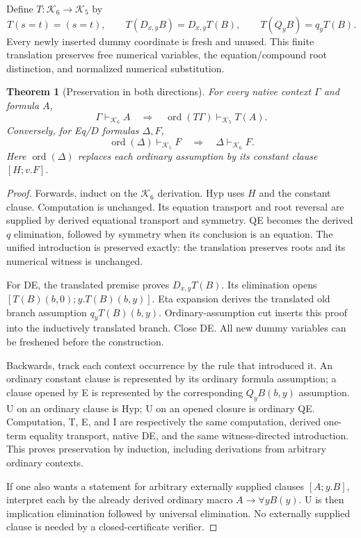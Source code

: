 \documentclass[11pt,letterpaper]{article}
\newtheorem{theorem}{Theorem}[section]
\theoremstyle{definition}\newtheorem{definition}[theorem]{Definition}
\begin{document}
Define $T:\mathcal K_6\to\mathcal K_5$ by
\[
 T(s=t)=(s=t),\qquad
 T(D_{x,y}B)=D_{x,y}T(B),\qquad
 T(Q_yB)=q_yT(B).
\]
Every newly inserted dummy coordinate is fresh and unused. This finite
translation preserves free numerical variables, the equation/compound
root distinction, and normalized numerical substitution.

\begin{theorem}[Preservation in both directions]
For every native context $\Gamma$ and formula $A$,
\[
 \Gamma\vdash_{\mathcal K_6} A
 \quad\Longrightarrow\quad
 \operatorname{ord}(T\Gamma)\vdash_{\mathcal K_5}T(A).
\]
Conversely, for Eq/$D$ formulas $\Delta,F$,
\[
 \operatorname{ord}(\Delta)\vdash_{\mathcal K_5}F
 \quad\Longrightarrow\quad
 \Delta\vdash_{\mathcal K_6}F.
\]
Here $\operatorname{ord}(\Delta)$ replaces each ordinary assumption by its
constant clause $[H;v.F]$.
\end{theorem}
\begin{proof}
Forwards, induct on the $\mathcal K_6$ derivation. Hyp uses $H$ and the
constant clause. Computation is unchanged. Its equation transport and
root reversal are supplied by derived equational transport and symmetry.
QE becomes the derived $q$ elimination, followed by symmetry when its
conclusion is an equation. The unified introduction is preserved exactly:
the translation preserves roots and its numerical witness is unchanged.

For DE, the translated premise proves $D_{x,y}T(B)$. Its elimination
opens $[T(B)(b,0);y.T(B)(b,y)]$. Eta expansion derives the translated old
branch assumption $q_yT(B)(b,y)$. Ordinary-assumption cut inserts this
proof into the inductively translated branch. Close DE. All new dummy
variables can be freshened before the construction.

Backwards, track each context occurrence by the rule that introduced it.
An ordinary constant clause is represented by its ordinary formula
assumption; a clause opened by E is represented by the corresponding
$Q_yB(b,y)$ assumption. U on an ordinary clause is Hyp; U on an opened
closure is ordinary QE. Computation, T, E, and I are respectively the
same computation, derived one-term equality transport, native DE, and
the same witness-directed introduction. This proves preservation by
induction, including derivations from arbitrary ordinary contexts.

If one also wants a statement for arbitrary externally supplied clauses
$[A;y.B]$, interpret each by the already derived ordinary macro
$A\to\forall yB(y)$. U is then implication elimination followed by
universal elimination. No externally supplied clause is needed by a
closed-certificate verifier.
\end{proof}
\end{document}
